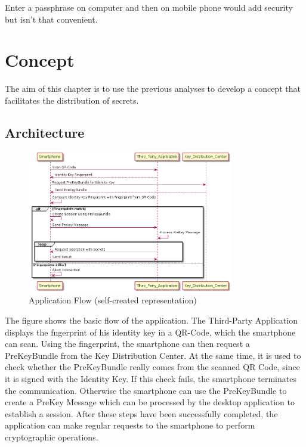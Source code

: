 \documentclass[12pt,oneside,a4paper,parskip]{scrbook}
\begin{document}
Enter a passphrase on computer and then on mobile phone would add security but isn't that convenient.

\chapter{Concept}
The aim of this chapter is to use the previous analyses to develop a concept that facilitates the distribution of secrets.

\section{Architecture}
\begin{figure}[ht]
	\centering
  \includegraphics[width=0.8\textwidth]{ressources/process_flow.png}
  \caption{Application Flow (self-created representation)}
  \label{fig:app_flo}
\end{figure}
The figure shows the basic flow of the application. The Third-Party Application displays the fngerprint of his identity key in a QR-Code, which the smartphone can scan. Using the fingerprint, the smartphone can then request a PreKeyBundle from the Key Distribution Center. At the same time, it is used to check whether the PreKeyBundle really comes from the scanned QR Code, since it is signed with the Identity Key. If this check fails, the smartphone terminates the communication. Otherwise the smartphone can use the PreKeyBundle to create a PreKey Message which can be processed by the desktop application to establish a session. After these steps have been successfully completed, the application can make regular requests to the smartphone to perform cryptographic operations.
\end{document}
